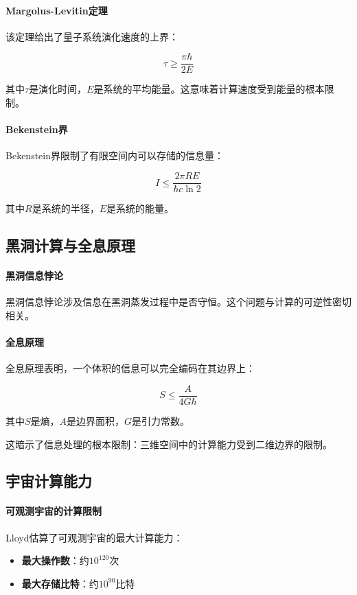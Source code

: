 \paragraph{Margolus-Levitin定理}
该定理给出了量子系统演化速度的上界：

$$\tau \geq \frac{\pi \hbar}{2E}$$

其中$\tau$是演化时间，$E$是系统的平均能量。这意味着计算速度受到能量的根本限制。

\paragraph{Bekenstein界}
Bekenstein界限制了有限空间内可以存储的信息量：

$$I \leq \frac{2\pi R E}{\hbar c \ln 2}$$

其中$R$是系统的半径，$E$是系统的能量。

\subsection{黑洞计算与全息原理}

\paragraph{黑洞信息悖论}
黑洞信息悖论涉及信息在黑洞蒸发过程中是否守恒。这个问题与计算的可逆性密切相关。

\paragraph{全息原理}
全息原理表明，一个体积的信息可以完全编码在其边界上：

$$S \leq \frac{A}{4G\hbar}$$

其中$S$是熵，$A$是边界面积，$G$是引力常数。

这暗示了信息处理的根本限制：三维空间中的计算能力受到二维边界的限制。

\subsection{宇宙计算能力}

\paragraph{可观测宇宙的计算限制}
Lloyd估算了可观测宇宙的最大计算能力：
\begin{itemize}
\item \textbf{最大操作数}：约$10^{120}$次
\item \textbf{最大存储比特}：约$10^{90}$比特
\end{itemize}

